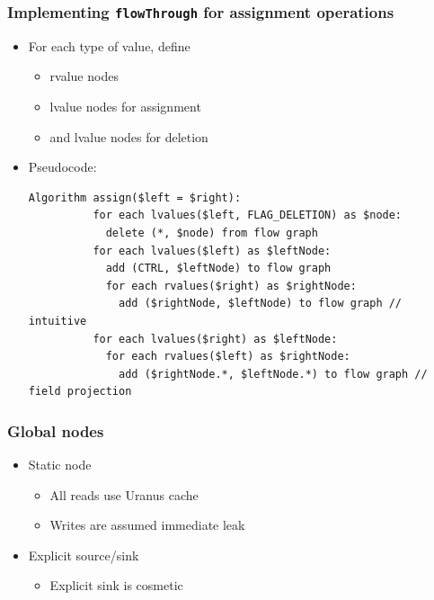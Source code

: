 \documentclass{beamer}
\newcommand{\code}[1]{\colorbox{code}{\texttt{\footnotesize #1}}}
\begin{document}
\begin{frame}[fragile]
  \frametitle{Implementing \code{flowThrough} for assignment operations}
  \begin{itemize}
    \item For each type of value, define
      \begin{itemize}
        \item rvalue nodes
        \item lvalue nodes for assignment
        \item and lvalue nodes for deletion
      \end{itemize}
    \item Pseudocode:
      \begin{lstlisting}[style=j, gobble=8, tabsize=2, basicstyle=\ttfamily\tiny]
        Algorithm assign($left = $right):
          for each lvalues($left, FLAG_DELETION) as $node:
            delete (*, $node) from flow graph
          for each lvalues($left) as $leftNode:
            add (CTRL, $leftNode) to flow graph
            for each rvalues($right) as $rightNode:
              add ($rightNode, $leftNode) to flow graph // intuitive
          for each lvalues($right) as $leftNode:
            for each rvalues($left) as $rightNode:
              add ($rightNode.*, $leftNode.*) to flow graph // field projection
      \end{lstlisting}
  \end{itemize}
\end{frame}

\begin{frame}
  \frametitle{Global nodes}
  \begin{itemize}
    \item Static node
      \begin{itemize}
        \item All reads use Uranus cache
        \item Writes are assumed immediate leak
      \end{itemize}
    \item Explicit source/sink
      \begin{itemize}
        \item Explicit sink is cosmetic
      \end{itemize}
  \end{itemize}
\end{frame}
\end{document}
